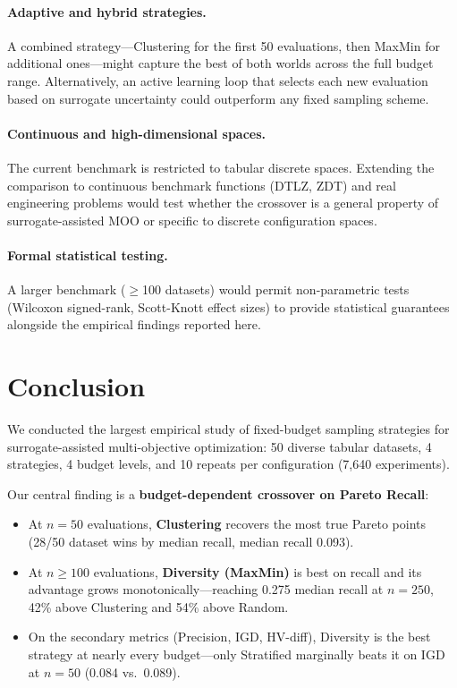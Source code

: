\documentclass[sigconf,nonacm]{acmart}
\begin{document}
\paragraph{Adaptive and hybrid strategies.}
A combined strategy---Clustering for the first 50 evaluations, then MaxMin
for additional ones---might capture the best of both worlds across the full
budget range.
Alternatively, an active learning loop that selects each new evaluation based
on surrogate uncertainty could outperform any fixed sampling scheme.

\paragraph{Continuous and high-dimensional spaces.}
The current benchmark is restricted to tabular discrete spaces.
Extending the comparison to continuous benchmark functions (DTLZ, ZDT) and
real engineering problems would test whether the crossover is a general
property of surrogate-assisted MOO or specific to discrete configuration
spaces.

\paragraph{Formal statistical testing.}
A larger benchmark ($\geq$100 datasets) would permit non-parametric tests
(Wilcoxon signed-rank, Scott-Knott effect sizes) to provide statistical
guarantees alongside the empirical findings reported here.

\section{Conclusion}
\label{sec:conclusion}

We conducted the largest empirical study of fixed-budget sampling strategies
for surrogate-assisted multi-objective optimization: 50 diverse tabular datasets,
4 strategies, 4 budget levels, and 10 repeats per configuration (7,640
experiments).

Our central finding is a \textbf{budget-dependent crossover on Pareto
Recall}:
\begin{itemize}[leftmargin=*]
  \item At $n=50$ evaluations, \textbf{Clustering} recovers the most true
  Pareto points (28/50 dataset wins by median recall, median recall 0.093).
  \item At $n \geq 100$ evaluations, \textbf{Diversity (MaxMin)} is best
  on recall and its advantage grows monotonically---reaching 0.275 median
  recall at $n=250$, 42\% above Clustering and 54\% above Random.
  \item On the secondary metrics (Precision, IGD, HV-diff), Diversity is
  the best strategy at nearly every budget---only Stratified marginally
  beats it on IGD at $n=50$ (0.084 vs.\ 0.089).
\end{itemize}
\end{document}
